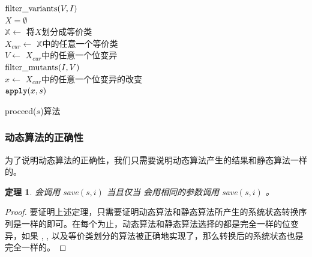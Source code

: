\documentclass[nofonts]{ctexrep}
\newtheorem{proof}{证明}
\newtheorem{theorem}{定理}
\begin{document}
\begin{algorithm}[t]
  ${\mathrm{filter\_variants}}(V, I)$\\
  $X = \emptyset$\\
  $\mathbb{X} \leftarrow$ 将$X$划分成等价类\\
  $X_{cur} \leftarrow$ $\mathbb{X}$中的任意一个等价类\\
  $V \leftarrow$ $X_{cur}$中的任意一个位变异\\
  $\mathrm{filter\_mutants}(I, V)$\\ 
  $x \leftarrow$ $X_{cur}$中的任意一个位变异的改变\\
  $\mathtt{apply}(x, s)$
\caption{proceed($s$)算法}
\label{alg:advanced}
\end{algorithm}

\subsubsection{动态算法的正确性}
为了说明动态算法的正确性，我们只需要说明动态算法产生的结果和静态算法一样的。
\begin{theorem}
   会调用 save$(s, i)$ 当且仅当 
  会用相同的参数调用 save$(s, i)$ 。
\end{theorem}
\begin{proof}

  要证明上述定理，只需要证明动态算法和静态算法所产生的系统状态转换序列是一样的即可。在每个为止，动态算法和静态算法选择的都是完全一样的位变异，如果 \try, \apply, 以及等价类划分的算法被正确地实现了，那么转换后的系统状态也是完全一样的。

\end{proof}
\end{document}
